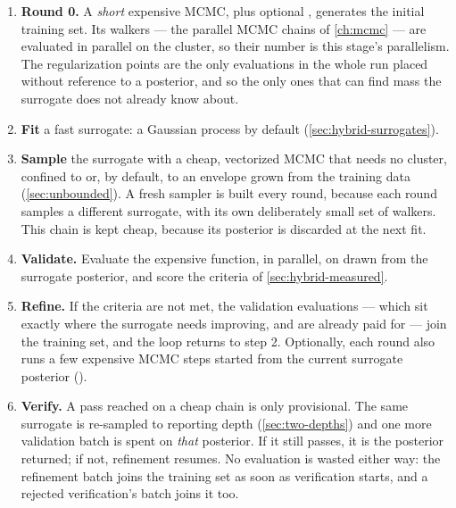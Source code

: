 \begin{enumerate}[leftmargin=*, label=\textbf{\arabic*.}]
  \item \textbf{Round 0.} A \emph{short} expensive MCMC, plus optional
        , generates the initial training set. Its walkers --- the
        parallel MCMC chains of \cref{ch:mcmc} --- are evaluated in parallel on the cluster, so
        their number is this stage's parallelism. The regularization points are the only
        evaluations in the whole run placed without reference to a posterior, and so the only ones
        that can find mass the surrogate does not already know about.
  \item \textbf{Fit} a fast surrogate: a Gaussian process \citep{rasmussen2006} by default
        (\cref{sec:hybrid-surrogates}).
  \item \textbf{Sample} the surrogate with a cheap, vectorized MCMC that needs no cluster, confined
        to  or, by default, to an envelope grown from the training data
        (\cref{sec:unbounded}). A fresh sampler is built every round, because each round samples a
        different surrogate, with its own deliberately small set of walkers. This chain is kept
        cheap, because its posterior is discarded at the next fit.
  \item \textbf{Validate.} Evaluate the expensive function, in parallel, on
         drawn from the surrogate posterior, and score the criteria of
        \cref{sec:hybrid-measured}.
  \item \textbf{Refine.} If the criteria are not met, the validation evaluations --- which sit
        exactly where the surrogate needs improving, and are already paid for --- join the training
        set, and the loop returns to step 2. Optionally, each round also runs a few expensive MCMC
        steps started from the current surrogate posterior ().
  \item \textbf{Verify.} A pass reached on a cheap chain is only provisional. The same surrogate is
        re-sampled to reporting depth (\cref{sec:two-depths}) and one more validation batch is
        spent on \emph{that} posterior. If it still passes, it is the posterior returned; if not,
        refinement resumes. No evaluation is wasted either way: the refinement batch joins the
        training set as soon as verification starts, and a rejected verification's batch joins it
        too.
\end{enumerate}

